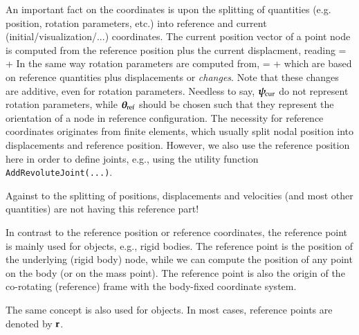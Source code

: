 %
An important fact on the coordinates is upon the splitting of quantities (e.g. position, rotation parameters, etc.) into reference and current (initial/visualization/...) coordinates.
The current position vector of a point node is computed from the reference position plus the current displacment, reading
\be
  \pv\cCur = \pv\cRef + \uv\cCur
\ee
In the same way rotation parameters are computed from,
\be
  \ttheta\cCur = \ttheta\cRef + \tpsi\cCur
\ee
which are based on reference quantities plus displacements or {\it changes}. Note that these changes are additive, even for rotation parameters. Needless to say, $\mbox{\boldmath $\psi$ \unboldmath}\!\!_\mathrm{cur}$ do not represent rotation parameters, while $\mbox{\boldmath $\theta$ \unboldmath}\!\!_\mathrm{ref}$ should be chosen such that they represent the orientation of a node in reference configuration.
The necessity for reference coordinates originates from finite elements, which usually split nodal position into displacements and reference position.
However, we also use the reference position here in order to define joints, e.g., using the utility function \texttt{AddRevoluteJoint(...)}.

Against to the splitting of positions, displacements and velocities (and most other quantities) are not having this reference part!

%
In contrast to the reference position or reference coordinates, the reference point is mainly used for objects, e.g., rigid bodies.
The reference point is the position of the underlying (rigid body) node, while we can compute the position of any point on the body (or on the mass point).
The reference point is also the origin of the co-rotating (reference) frame with the body-fixed coordinate system.

The same concept is also used for  objects. In most cases, reference points are denoted by $\mathbf{r}$.

